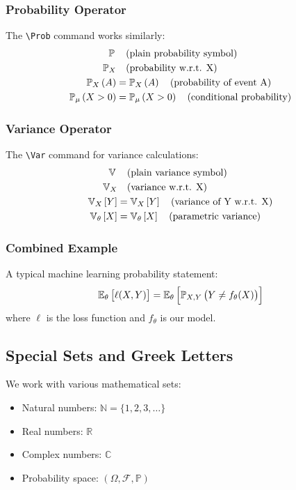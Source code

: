 \documentclass[english]{thesis-uoc}
\begin{document}
\subsubsection{Probability Operator}
The \verb|\Prob| command works similarly:
%
\begin{align}
\Prob &\quad \text{(plain probability symbol)} \\
\Prob[X] &\quad \text{(probability w.r.t. X)} \\
\Prob[X][A] &= \mathbb{P}_X \left( A \right) \quad \text{(probability of event A)} \\
\Prob[\mu][X > 0] &= \mathbb{P}_\mu \left( X > 0 \right) \quad \text{(conditional probability)}
\end{align}

\subsubsection{Variance Operator}
The \verb|\Var| command for variance calculations:
%
\begin{align}
\Var &\quad \text{(plain variance symbol)} \\
\Var[X] &\quad \text{(variance w.r.t. X)} \\
\Var[X][Y] &= \mathbb{V}_X \left[ Y \right] \quad \text{(variance of Y w.r.t. X)} \\
\Var[\theta][X] &= \mathbb{V}_\theta \left[ X \right] \quad \text{(parametric variance)}
\end{align}

\subsubsection{Combined Example}
A typical machine learning probability statement:
%
\begin{equation}
\Mean[\theta][\ell(X, Y)] = \Mean[\theta]\left[ \Prob[X,Y][Y \neq f_\theta(X)] \right]
\end{equation}
%
where $\ell$ is the loss function and $f_\theta$ is our model.

\subsection{Special Sets and Greek Letters}
We work with various mathematical sets:
%
\begin{itemize}
\item Natural numbers: $\mathbb{N} = \{1, 2, 3, \ldots\}$
\item Real numbers: $\mathbb{R}$
\item Complex numbers: $\mathbb{C}$
\item Probability space: $(\Omega, \mathcal{F}, \mathbb{P})$
\end{itemize}
%
\end{document}
